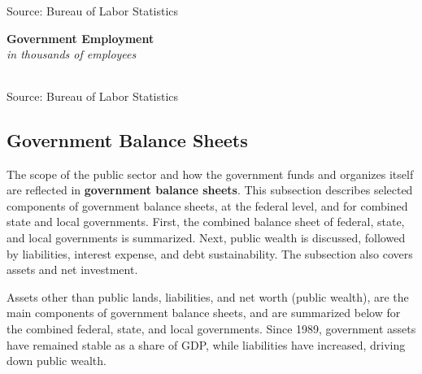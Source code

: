 \documentclass{report}
\newcommand{\tbllink}[1]{\href{https://raw.githubusercontent.com/bdecon/US-chartbook/master/chartbook/data/#1}{\faTable}}
\begin{document}
{\begin{minipage}{0.34\textwidth}
\footnotesize{Source: Bureau of Labor Statistics} \hfill \tbllink{govjobs.csv}
\end{minipage}\hspace{5mm}
\begin{minipage}{0.38\textwidth}
\small 
\end{minipage}
\vspace{3mm}

\begin{minipage}{0.76\textwidth}
\normalsize \textbf{Government Employment}\\
\footnotesize{\textit{in thousands of employees}}
\vspace*{-5mm}

 \setlength{\tabcolsep}{2.8pt} \color{black!90}
	{\renewcommand{\arraystretch}{1.52}
		\begin{tabular}{p{32mm} R{12mm} R{12mm} R{12mm} R{12mm} R{12mm} R{12mm}}
			  \hline
		\end{tabular}}
\vspace*{-2mm}
		
\footnotesize{Source: Bureau of Labor Statistics}
\end{minipage}
\newpage
\vspace*{-10mm}

\hypertarget{govbs}{\label{govbs}}
\begin{minipage}{0.76\textwidth}
\subsection*{Government Balance Sheets}   

\small The scope of the public sector and how the government funds and organizes itself are reflected in \textbf{government balance sheets}. This subsection describes selected components of government balance sheets, at the federal level, and for combined state and local governments. First, the combined balance sheet of federal, state, and local governments is summarized. Next, public wealth is discussed, followed by liabilities, interest expense, and debt sustainability. The subsection also covers assets and net investment. 

Assets other than public lands, liabilities, and net worth (public wealth), are the main components of government balance sheets, and are summarized below for the combined federal, state, and local governments. Since 1989, government assets have remained stable as a share of GDP, while liabilities have increased, driving down public wealth. 
\end{minipage}
\vspace{0.5mm}

}
\end{document}
